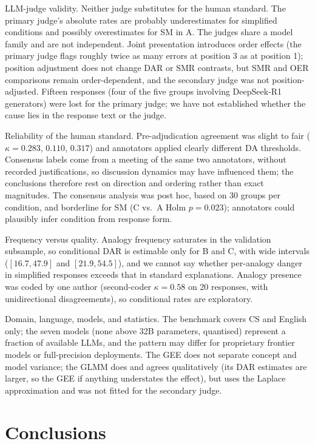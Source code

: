 \documentclass[journal,article,submit,pdftex,moreauthors]{Definitions/mdpi}
\begin{document}
LLM-judge validity. Neither judge substitutes for the human standard. The primary judge's absolute rates are probably underestimates for simplified conditions and possibly overestimates for SM in A. The judges share a model family and are not independent. Joint presentation introduces order effects (the primary judge flags roughly twice as many errors at position 3 as at position 1); position adjustment does not change DAR or SMR contrasts, but SMR and OER comparisons remain order-dependent, and the secondary judge was not position-adjusted. Fifteen responses (four of the five groups involving DeepSeek-R1 generators) were lost for the primary judge; we have not established whether the cause lies in the response text or the judge.

Reliability of the human standard. Pre-adjudication agreement was slight to fair ($\kappa = 0.283$, $0.110$, $0.317$) and annotators applied clearly different DA thresholds. Consensus labels come from a meeting of the same two annotators, without recorded justifications, so discussion dynamics may have influenced them; the conclusions therefore rest on direction and ordering rather than exact magnitudes. The consensus analysis was post hoc, based on 30 groups per condition, and borderline for SM (C vs.\ A Holm $p = 0.023$); annotators could plausibly infer condition from response form.

Frequency versus quality. Analogy frequency saturates in the validation subsample, so conditional DAR is estimable only for B and C, with wide intervals ($[16.7, 47.9]$ and $[21.9, 54.5]$), and we cannot say whether per-analogy danger in simplified responses exceeds that in standard explanations. Analogy presence was coded by one author (second-coder $\kappa = 0.58$ on 20 responses, with unidirectional disagreements), so conditional rates are exploratory.

Domain, language, models, and statistics. The benchmark covers CS and English only; the seven models (none above 32B parameters, quantised) represent a fraction of available LLMs, and the pattern may differ for proprietary frontier models or full-precision deployments. The GEE does not separate concept and model variance; the GLMM does and agrees qualitatively (its DAR estimates are larger, so the GEE if anything understates the effect), but uses the Laplace approximation and was not fitted for the secondary judge.

\section{Conclusions}
\label{sec:conclusion}
\end{document}

